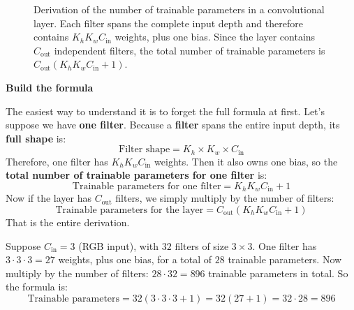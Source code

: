 \begin{figure}[!htp]
  \caption{Derivation of the number of trainable parameters in a convolutional layer. Each filter spans the complete input depth and therefore contains $K_h K_w C_{\text{in}}$ weights, plus one bias. Since the layer contains $C_{\text{out}}$ independent filters, the total number of trainable parameters is $C_{\text{out}} \left( K_h K_w C_{\text{in}} + 1 \right)$.}
  \label{fig:counting-convolutional-parameters}
\end{figure}

\highspace
\begin{flushleft}
    \textcolor{Green3}{ \textbf{Build the formula}}
\end{flushleft}
The easiest way to understand it is to forget the full formula at first. Let's suppose we have \textbf{one filter}. Because a \textbf{filter} spans the entire input depth, its \textbf{full shape} is:
\begin{equation*}
    \text{Filter shape} = K_h \times K_w \times C_{\text{in}}
\end{equation*}
Therefore, one filter has $K_h K_w C_{\text{in}}$ weights. Then it also owns one bias, so the \textbf{total number of trainable parameters for one filter} is:
\begin{equation}\label{eq:trainable-parameters-for-one-filter}
    \text{Trainable parameters for one filter} = K_h K_w C_{\text{in}} + 1
\end{equation}
Now if the layer has $C_{\text{out}}$ filters, we simply multiply by the number of filters:
\begin{equation*}
    \text{Trainable parameters for the layer} = C_{\text{out}} \left( K_h K_w C_{\text{in}} + 1 \right)
\end{equation*}
That is the entire derivation.

\highspace
\begin{examplebox}
    Suppose $C_{\text{in}} = 3$ (RGB input), with $32$ filters of size $3 \times 3$. One filter has $3 \cdot 3 \cdot 3 = 27$ weights, plus one bias, for a total of $28$ trainable parameters. Now multiply by the number of filters: $28 \cdot 32 = 896$ trainable parameters in total. So the formula is:
    \begin{equation*}
        \text{Trainable parameters} = 32 \left( 3 \cdot 3 \cdot 3 + 1 \right) = 32 \left( 27 + 1 \right) = 32 \cdot 28 = 896
    \end{equation*}
\end{examplebox}

